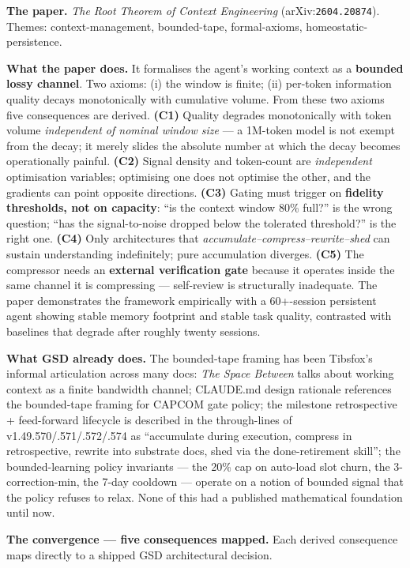 \documentclass[11pt,letterpaper]{article}
\newcommand{\arxivid}[1]{\texttt{\textcolor{accent}{#1}}}
\begin{document}
\textbf{The paper.} \emph{The Root Theorem of Context Engineering}
(arXiv:\arxivid{2604.20874}). Themes: context-management, bounded-tape,
formal-axioms, homeostatic-persistence.

\textbf{What the paper does.} It formalises the agent's working context
as a \textbf{bounded lossy channel}. Two axioms: (i) the window is
finite; (ii) per-token information quality decays monotonically with
cumulative volume. From these two axioms five consequences are derived.
\textbf{(C1)} Quality degrades monotonically with token volume
\emph{independent of nominal window size} --- a 1M-token model is not
exempt from the decay; it merely slides the absolute number at which the
decay becomes operationally painful. \textbf{(C2)} Signal density and
token-count are \emph{independent} optimisation variables; optimising
one does not optimise the other, and the gradients can point opposite
directions. \textbf{(C3)} Gating must trigger on \textbf{fidelity
thresholds, not on capacity}: ``is the context window 80\% full?'' is
the wrong question; ``has the signal-to-noise dropped below the
tolerated threshold?'' is the right one. \textbf{(C4)} Only
architectures that \emph{accumulate--compress--rewrite--shed} can
sustain understanding indefinitely; pure accumulation diverges.
\textbf{(C5)} The compressor needs an \textbf{external verification
gate} because it operates inside the same channel it is compressing ---
self-review is structurally inadequate. The paper demonstrates the
framework empirically with a 60+-session persistent agent showing stable
memory footprint and stable task quality, contrasted with baselines that
degrade after roughly twenty sessions.

\textbf{What GSD already does.} The bounded-tape framing has been
Tibsfox's informal articulation across many docs: \emph{The Space
Between} talks about working context as a finite bandwidth channel;
CLAUDE.md design rationale references the bounded-tape framing for
CAPCOM gate policy; the milestone retrospective + feed-forward lifecycle
is described in the through-lines of v1.49.570/.571/.572/.574 as
``accumulate during execution, compress in retrospective, rewrite into
substrate docs, shed via the done-retirement skill''; the
bounded-learning policy invariants --- the 20\% cap on auto-load slot
churn, the 3-correction-min, the 7-day cooldown --- operate on a notion
of bounded signal that the policy refuses to relax. None of this had a
published mathematical foundation until now.

\textbf{The convergence --- five consequences mapped.} Each derived
consequence maps directly to a shipped GSD architectural decision.
\end{document}
